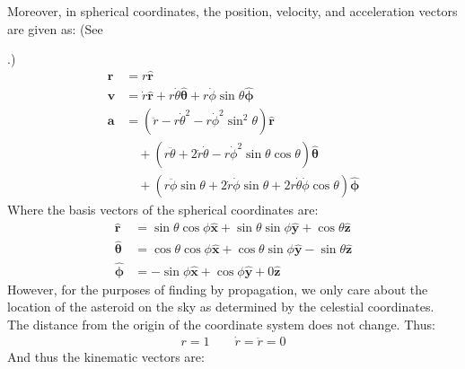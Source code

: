 \documentclass[letterpaper,11pt,english]{sphinxmanual}
\begin{document}
\sphinxAtStartPar
Moreover, in spherical coordinates, the position, velocity, and acceleration
vectors are given as: (See %
\begin{footnote}[68]\sphinxAtStartFootnote
{}
%
\end{footnote}.)
\begin{equation*}
\begin{split}\mathbf{r} &= r \mathbf{\hat r} \\
\mathbf{v} &= \dot{r} \mathbf{\hat r} + r \dot\theta \hat{\boldsymbol\theta } + r \dot\phi \sin\theta \mathbf{\hat{\boldsymbol\phi}} \\
\mathbf{a} &= \left(\ddot{r} - r\dot\theta^2 - r\dot\phi^2\sin^2\theta \right)\mathbf{\hat r} \\
 &\quad + \left( r\ddot\theta + 2\dot{r}\dot\theta - r\dot\phi^2\sin\theta\cos\theta \right) \hat{\boldsymbol\theta } \\
 &\quad + \left( r\ddot\phi\sin\theta + 2\dot{r}\dot\phi\sin\theta + 2 r\dot\theta\dot\phi\cos\theta \right) \hat{\boldsymbol\phi}\end{split}
\end{equation*}
\sphinxAtStartPar
Where the basis vectors of the spherical coordinates are:
\begin{equation*}
\begin{split}\hat{\mathbf r} &= \sin\theta \cos\phi \hat{\mathbf x} + \sin\theta \sin\phi \hat{\mathbf y} + \cos\theta \hat{\mathbf z} \\
\hat{\boldsymbol\theta} &= \cos\theta \cos\phi \hat{\mathbf x} + \cos\theta \sin\phi \hat{\mathbf y} - \sin\theta \hat{\mathbf z} \\
\hat{\boldsymbol\phi} &= - \sin\phi \hat{\mathbf x} + \cos\phi \hat{\mathbf y} + 0 \hat{\mathbf z}\end{split}
\end{equation*}
\sphinxAtStartPar
However, for the purposes of finding by propagation, we only care about the
location of the asteroid on the sky as determined by the celestial coordinates.
The distance from the origin of the coordinate system does not change. Thus:
\begin{equation*}
\begin{split}r = 1 \qquad \dot{r} = \ddot{r} = 0\end{split}
\end{equation*}
\sphinxAtStartPar
And thus the kinematic vectors are:
\end{document}
